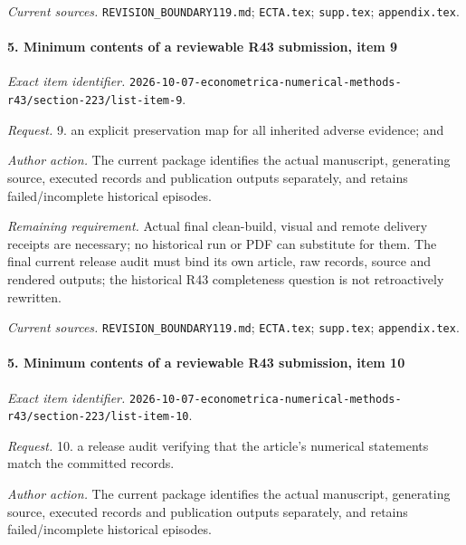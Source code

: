 \par\emph{Current sources.} \nolinkurl{REVISION_BOUNDARY119.md}; \nolinkurl{ECTA.tex}; \nolinkurl{supp.tex}; \nolinkurl{appendix.tex}.

\paragraph{5. Minimum contents of a reviewable R43 submission, item 9}

\emph{Exact item identifier.} \nolinkurl{2026-10-07-econometrica-numerical-methods-r43/section-223/list-item-9}.

\par\emph{Request.} 9. an explicit preservation map for all inherited adverse evidence; and

\par\emph{Author action.} The current package identifies the actual manuscript, generating source, executed records and publication outputs separately, and retains failed/\allowbreak{}incomplete historical episodes.

\par\emph{Remaining requirement.} Actual final clean-build, visual and remote delivery receipts are necessary; no historical run or PDF can substitute for them. The final current release audit must bind its own article, raw records, source and rendered outputs; the historical R43 completeness question is not retroactively rewritten.

\par\emph{Current sources.} \nolinkurl{REVISION_BOUNDARY119.md}; \nolinkurl{ECTA.tex}; \nolinkurl{supp.tex}; \nolinkurl{appendix.tex}.

\paragraph{5. Minimum contents of a reviewable R43 submission, item 10}

\emph{Exact item identifier.} \nolinkurl{2026-10-07-econometrica-numerical-methods-r43/section-223/list-item-10}.

\par\emph{Request.} 10. a release audit verifying that the article’s numerical statements match the committed records.

\par\emph{Author action.} The current package identifies the actual manuscript, generating source, executed records and publication outputs separately, and retains failed/\allowbreak{}incomplete historical episodes.

